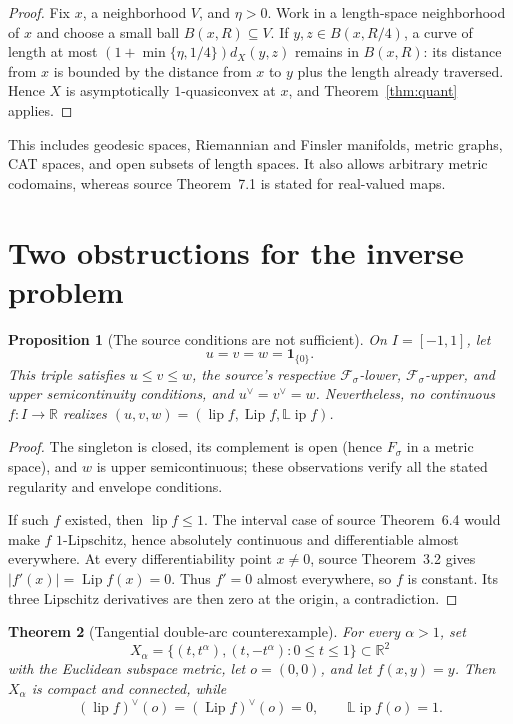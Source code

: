 \documentclass[11pt]{article}
\newtheorem{theorem}{Theorem}
\newtheorem{proposition}[theorem]{Proposition}
\theoremstyle{definition}
\newcommand{\lipf}{\operatorname{lip}}
\newcommand{\Lipf}{\operatorname{Lip}}
\newcommand{\LLip}{\mathbb L\!\operatorname{ip}}
\newcommand{\R}{\mathbb R}
\begin{document}
\begin{proof}
Fix $x$, a neighborhood $V$, and $\eta>0$.  Work in a length-space
neighborhood of $x$ and choose a small ball $B(x,R)\subseteq V$.  If
$y,z\in B(x,R/4)$, a curve of length at most
$(1+\min\{\eta,1/4\})d_X(y,z)$ remains in $B(x,R)$: its distance from $x$
is bounded by the distance from $x$ to $y$ plus the length already traversed.
Hence $X$ is asymptotically $1$-quasiconvex at $x$, and
Theorem~\ref{thm:quant} applies.
\end{proof}

This includes geodesic spaces, Riemannian and Finsler manifolds, metric
graphs, CAT spaces, and open subsets of length spaces.  It also allows
arbitrary metric codomains, whereas source Theorem~7.1 is stated for
real-valued maps.

\section{Two obstructions for the inverse problem}

\begin{proposition}[The source conditions are not sufficient]\label{prop:spike}
On $I=[-1,1]$, let
\[
 u=v=w=\mathbf1_{\{0\}}.
\]
This triple satisfies $u\leq v\leq w$, the source's respective
$\mathcal F_\sigma$-lower, $\mathcal F_\sigma$-upper, and upper
semicontinuity conditions, and $u^\vee=v^\vee=w$.  Nevertheless, no
continuous $f:I\to\R$ realizes
$(u,v,w)=(\lipf f,\Lipf f,\LLip f)$.
\end{proposition}

\begin{proof}
The singleton is closed, its complement is open (hence $F_\sigma$ in a
metric space), and $w$ is upper semicontinuous; these observations verify
all the stated regularity and envelope conditions.

If such $f$ existed, then $\lipf f\leq1$.  The interval case of source
Theorem~6.4 would make $f$ $1$-Lipschitz, hence absolutely continuous and
differentiable almost everywhere.  At every differentiability point
$x\ne0$, source Theorem~3.2 gives
$|f'(x)|=\Lipf f(x)=0$.  Thus $f'=0$ almost everywhere, so $f$ is constant.
Its three Lipschitz derivatives are then zero at the origin, a contradiction.
\end{proof}

\begin{theorem}[Tangential double-arc counterexample]\label{thm:cusp}
For every $\alpha>1$, set
\[
 X_\alpha=\{(t,t^\alpha),(t,-t^\alpha):0\leq t\leq1\}
 \subset\R^2
\]
with the Euclidean subspace metric, let $o=(0,0)$, and let $f(x,y)=y$.
Then $X_\alpha$ is compact and connected, while
\[
 (\lipf f)^\vee(o)=(\Lipf f)^\vee(o)=0,
 \qquad \LLip f(o)=1.                                      \tag{2}
\]
\end{theorem}
\end{document}
